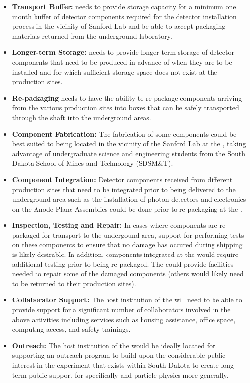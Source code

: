 \begin{itemize}
  \item {\bf Transport Buffer:}  needs to provide storage capacity 
    for a minimum one month buffer of detector components required for 
    the detector installation process in the vicinity of Sanford Lab and 
    be able to accept packaging materials returned from the underground 
    laboratory.
  \item {\bf Longer-term Storage:}   needs to provide longer-term 
    storage of detector components that need to be produced in advance 
    of when they are to be installed and for which sufficient storage 
    space does not exist at the production sites.      
  \item {\bf Re-packaging}  needs to have the ability to re-package 
    components arriving from the various production sites into boxes that
    can be safely transported through the shaft into the underground areas.  
  \item {\bf Component Fabrication:}  The fabrication of some components 
    could be best suited to being located in the vicinity of the Sanford 
    Lab at the , taking advantage of undergraduate science and engineering 
    students from the South Dakota School of Mines and Technology (SDSM\&T).
  \item {\bf Component Integration:} Detector components received from 
    different production sites that need to be integrated prior to being 
    delivered to the underground area such as the installation of photon 
    detectors and electronics on the Anode Plane Assemblies could be done
    prior to re-packaging at the .    
  \item {\bf Inspection, Testing and Repair:} In cases where components 
    are re-packaged for transport to the undergound area,  support 
    for performing tests on these components to ensure that no damage has 
    occured during shipping is likely desirable.  In addition, components 
    integrated at the  would require additional testing prior to being 
    re-packaged.  The  could provide facilities needed to repair some 
    of the damaged components (others would likely need to be returned to
    their production sites).     
  \item {\bf Collaborator Support:} The host institution of the 
    will need to be able to provide support for a significant number
    of  collaborators involved in the above activities
    including services such as housing assistance, office space,
    computing access, and safety trainings.
  \item {\bf Outreach:} The host institution of the  would be
    ideally located for supporting an outreach program to build upon
    the considerable public interest in the experiment that exists
    within South Dakota to create long-term public support for
     specifically and particle physics more generally.
\end{itemize}

